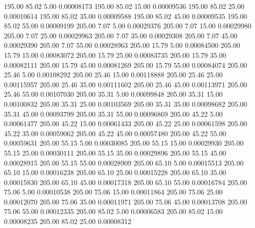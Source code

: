     195.00     85.02      5.00     0.00008173
    195.00     85.02     15.00     0.00009536
    195.00     85.02     25.00     0.00010614
    195.00     85.02     35.00     0.00009588
    195.00     85.02     45.00     0.00009535
    195.00     85.02     55.00     0.00009199
    205.00      7.07      5.00     0.00029376
    205.00      7.07     15.00     0.00029980
    205.00      7.07     25.00     0.00029963
    205.00      7.07     35.00     0.00029308
    205.00      7.07     45.00     0.00029390
    205.00      7.07     55.00     0.00028963
    205.00     15.79      5.00     0.00084500
    205.00     15.79     15.00     0.00083072
    205.00     15.79     25.00     0.00083735
    205.00     15.79     35.00     0.00082111
    205.00     15.79     45.00     0.00081269
    205.00     15.79     55.00     0.00084074
    205.00     25.46      5.00     0.00108292
    205.00     25.46     15.00     0.00118888
    205.00     25.46     25.00     0.00115957
    205.00     25.46     35.00     0.00111602
    205.00     25.46     45.00     0.00113971
    205.00     25.46     55.00     0.00107030
    205.00     35.31      5.00     0.00099848
    205.00     35.31     15.00     0.00100832
    205.00     35.31     25.00     0.00103569
    205.00     35.31     35.00     0.00098682
    205.00     35.31     45.00     0.00093799
    205.00     35.31     55.00     0.00096869
    205.00     45.22      5.00     0.00061477
    205.00     45.22     15.00     0.00061433
    205.00     45.22     25.00     0.00061598
    205.00     45.22     35.00     0.00059062
    205.00     45.22     45.00     0.00057480
    205.00     45.22     55.00     0.00059631
    205.00     55.15      5.00     0.00030085
    205.00     55.15     15.00     0.00029930
    205.00     55.15     25.00     0.00030111
    205.00     55.15     35.00     0.00029896
    205.00     55.15     45.00     0.00028915
    205.00     55.15     55.00     0.00028909
    205.00     65.10      5.00     0.00015513
    205.00     65.10     15.00     0.00016238
    205.00     65.10     25.00     0.00015228
    205.00     65.10     35.00     0.00015830
    205.00     65.10     45.00     0.00017318
    205.00     65.10     55.00     0.00016784
    205.00     75.06      5.00     0.00010538
    205.00     75.06     15.00     0.00011864
    205.00     75.06     25.00     0.00012070
    205.00     75.06     35.00     0.00011971
    205.00     75.06     45.00     0.00013708
    205.00     75.06     55.00     0.00012335
    205.00     85.02      5.00     0.00006583
    205.00     85.02     15.00     0.00008235
    205.00     85.02     25.00     0.00008312
